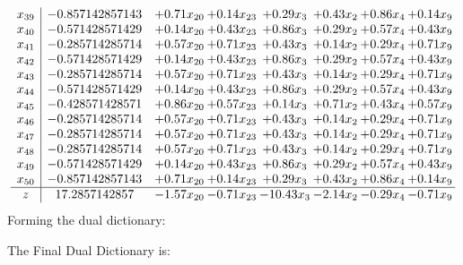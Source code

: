 \documentclass[8pt]{article}
\begin{document}
\[\begin{array}{c| c c@{\hskip 2pt} c@{\hskip 2pt} c@{\hskip 2pt} c@{\hskip 2pt} c@{\hskip 2pt} c@{\hskip 2pt} }
 x_{39}   &  -0.857142857143 & +  0.71 x_{20} & +  0.14 x_{23} & +  0.29 x_{3} & +  0.43 x_{2} & +  0.86 x_{4} & +  0.14 x_{9}\\
 x_{40}   &  -0.571428571429 & +  0.14 x_{20} & +  0.43 x_{23} & +  0.86 x_{3} & +  0.29 x_{2} & +  0.57 x_{4} & +  0.43 x_{9}\\
 x_{41}   &  -0.285714285714 & +  0.57 x_{20} & +  0.71 x_{23} & +  0.43 x_{3} & +  0.14 x_{2} & +  0.29 x_{4} & +  0.71 x_{9}\\
 x_{42}   &  -0.571428571429 & +  0.14 x_{20} & +  0.43 x_{23} & +  0.86 x_{3} & +  0.29 x_{2} & +  0.57 x_{4} & +  0.43 x_{9}\\
 x_{43}   &  -0.285714285714 & +  0.57 x_{20} & +  0.71 x_{23} & +  0.43 x_{3} & +  0.14 x_{2} & +  0.29 x_{4} & +  0.71 x_{9}\\
 x_{44}   &  -0.571428571429 & +  0.14 x_{20} & +  0.43 x_{23} & +  0.86 x_{3} & +  0.29 x_{2} & +  0.57 x_{4} & +  0.43 x_{9}\\
 x_{45}   &  -0.428571428571 & +  0.86 x_{20} & +  0.57 x_{23} & +  0.14 x_{3} & +  0.71 x_{2} & +  0.43 x_{4} & +  0.57 x_{9}\\
 x_{46}   &  -0.285714285714 & +  0.57 x_{20} & +  0.71 x_{23} & +  0.43 x_{3} & +  0.14 x_{2} & +  0.29 x_{4} & +  0.71 x_{9}\\
 x_{47}   &  -0.285714285714 & +  0.57 x_{20} & +  0.71 x_{23} & +  0.43 x_{3} & +  0.14 x_{2} & +  0.29 x_{4} & +  0.71 x_{9}\\
 x_{48}   &  -0.285714285714 & +  0.57 x_{20} & +  0.71 x_{23} & +  0.43 x_{3} & +  0.14 x_{2} & +  0.29 x_{4} & +  0.71 x_{9}\\
 x_{49}   &  -0.571428571429 & +  0.14 x_{20} & +  0.43 x_{23} & +  0.86 x_{3} & +  0.29 x_{2} & +  0.57 x_{4} & +  0.43 x_{9}\\
 x_{50}   &  -0.857142857143 & +  0.71 x_{20} & +  0.14 x_{23} & +  0.29 x_{3} & +  0.43 x_{2} & +  0.86 x_{4} & +  0.14 x_{9}\\
\hline
z    &  17.2857142857 & -1.57 x_{20} & -0.71 x_{23} & -10.43 x_{3} & -2.14 x_{2} & -0.29 x_{4} & -0.71 x_{9}\\
\end{array}\]
Forming the dual dictionary:

The Final Dual Dictionary is: 
\end{document}
